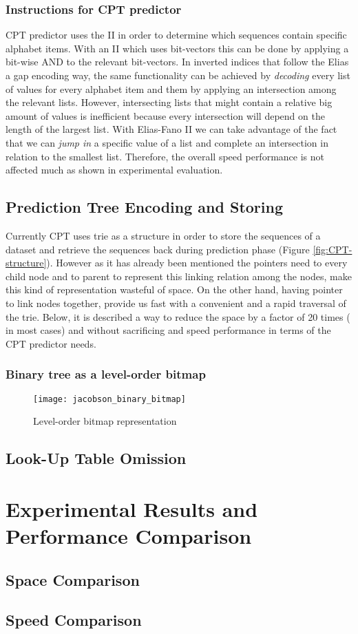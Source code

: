 \subsubsection{Instructions for CPT predictor}
CPT predictor uses the II in order to determine which sequences contain specific alphabet items. With an II which uses bit-vectors this can be done by applying a bit-wise AND to the relevant bit-vectors. In inverted indices that follow the Elias a gap encoding way, the same functionality can be achieved by \emph{decoding} every list of values for every alphabet item and them by applying an intersection among the relevant lists. However, intersecting lists that might contain a relative big amount of values is inefficient because every intersection will depend on the length of the largest list. With Elias-Fano II we can take advantage of the fact that we can \emph{jump in} a specific value of a list and complete an intersection in relation to the smallest list. Therefore, the overall speed performance is not affected much as shown in experimental evaluation.

\subsection{Prediction Tree Encoding and Storing}
Currently CPT uses trie as a structure in order to store the sequences of a dataset and retrieve the sequences back during prediction phase (Figure \ref{fig:CPT-structure}). However as it has already been mentioned the pointers need to every child node and to parent to represent this linking relation among the nodes, make this kind of representation wasteful of space. On the other hand, having pointer to link nodes together, provide us fast with a convenient and a rapid traversal of the trie. Below, it is described a way to reduce the space by a factor of 20 times (	in most cases) and without sacrificing and speed performance in terms of the CPT predictor needs.
\subsubsection{Binary tree as a level-order bitmap}

\begin{figure}
	 \centering
    \texttt{[image: jacobson\_binary\_bitmap]}
    \caption{Level-order bitmap representation}
    \label{fig:binary_bm}
\end{figure}

\subsection{Look-Up Table Omission}
\section{Experimental Results and Performance Comparison} \label{experimental}
\subsection{Space Comparison}
\subsection{Speed Comparison}



\newpage